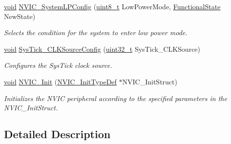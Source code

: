\begin{DoxyCompactItemize}
\hyperlink{group___n_a_m_e_ga18028b8badbf1ea7e704ccac3c488e82}{void} \hyperlink{group___m_i_s_c___private___functions_gae21011c5232f5b8f366acbecd12a1d4a}{N\-V\-I\-C\-\_\-\-System\-L\-P\-Config} (\hyperlink{stdint_8h_aba7bc1797add20fe3efdf37ced1182c5}{uint8\-\_\-t} Low\-Power\-Mode, \hyperlink{group___exported__types_gac9a7e9a35d2513ec15c3b537aaa4fba1}{Functional\-State} New\-State)
\begin{DoxyCompactList}\small\item\em Selects the condition for the system to enter low power mode. \end{DoxyCompactList}\item 
\hyperlink{group___n_a_m_e_ga18028b8badbf1ea7e704ccac3c488e82}{void} \hyperlink{group___m_i_s_c___private___functions_ga2777d255bb06ad62bb6372a9db1ff385}{Sys\-Tick\-\_\-\-C\-L\-K\-Source\-Config} (\hyperlink{stdint_8h_a435d1572bf3f880d55459d9805097f62}{uint32\-\_\-t} Sys\-Tick\-\_\-\-C\-L\-K\-Source)
\begin{DoxyCompactList}\small\item\em Configures the Sys\-Tick clock source. \end{DoxyCompactList}\item 
\hyperlink{group___n_a_m_e_ga18028b8badbf1ea7e704ccac3c488e82}{void} \hyperlink{group___m_i_s_c___private___functions_ga4ab373ed0870c06fca5eb51d639adf41}{N\-V\-I\-C\-\_\-\-Init} (\hyperlink{struct_n_v_i_c___init_type_def}{N\-V\-I\-C\-\_\-\-Init\-Type\-Def} $\ast$N\-V\-I\-C\-\_\-\-Init\-Struct)
\begin{DoxyCompactList}\small\item\em Initializes the N\-V\-I\-C peripheral according to the specified parameters in the N\-V\-I\-C\-\_\-\-Init\-Struct. \end{DoxyCompactList}\end{DoxyCompactItemize}


\subsection{Detailed Description}


